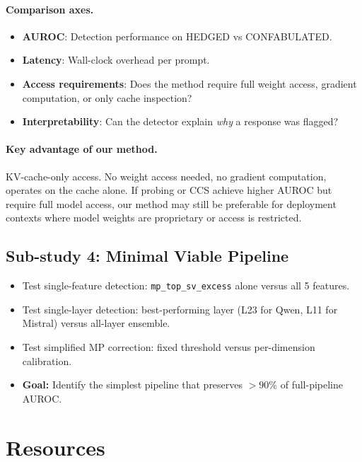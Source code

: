 \documentclass[11pt,letterpaper]{article}
\begin{document}
\paragraph{Comparison axes.}
\begin{itemize}
  \item \textbf{AUROC}: Detection performance on HEDGED vs CONFABULATED.
  \item \textbf{Latency}: Wall-clock overhead per prompt.
  \item \textbf{Access requirements}: Does the method require full weight
    access, gradient computation, or only cache inspection?
  \item \textbf{Interpretability}: Can the detector explain \emph{why} a
    response was flagged?
\end{itemize}

\paragraph{Key advantage of our method.} KV-cache-only access. No weight
access needed, no gradient computation, operates on the cache alone. If
probing or CCS achieve higher AUROC but require full model access, our
method may still be preferable for deployment contexts where model
weights are proprietary or access is restricted.

\subsection{Sub-study 4: Minimal Viable Pipeline}

\begin{itemize}
  \item Test single-feature detection: \texttt{mp\_top\_sv\_excess} alone
    versus all 5 features.
  \item Test single-layer detection: best-performing layer (L23 for Qwen,
    L11 for Mistral) versus all-layer ensemble.
  \item Test simplified MP correction: fixed threshold versus
    per-dimension calibration.
  \item \textbf{Goal:} Identify the simplest pipeline that preserves
    $> 90\%$ of full-pipeline AUROC.
\end{itemize}

\section{Resources}
\end{document}
